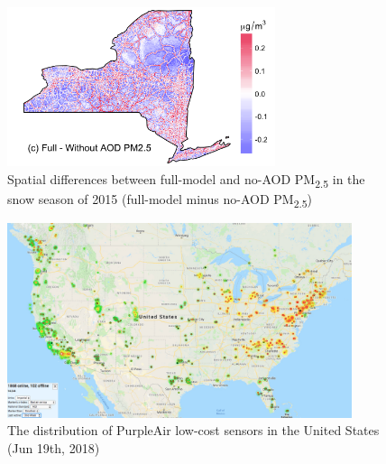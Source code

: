 \documentclass[11pt]{article}
\newcommand{\tsub}{\textsubscript}
\begin{document}
\newpage
\begin{figure}[H]
    \centering
    \includegraphics[width=0.7\textwidth]{img/no_aod.png}
    \caption{Spatial differences between full-model and no-AOD PM\tsub{2.5} in the snow season of 2015 (full-model minus no-AOD PM\tsub{2.5})}
    \label{fig:noaod}
\end{figure}

\begin{figure}[H]
    \centering
    \includegraphics[width=0.9\textwidth]{img/purpleair.jpg}
    \caption{The distribution of PurpleAir low-cost sensors in the United States (Jun 19th, 2018)}
    \label{fig:pa}
\end{figure}

\newpage


\end{document}
